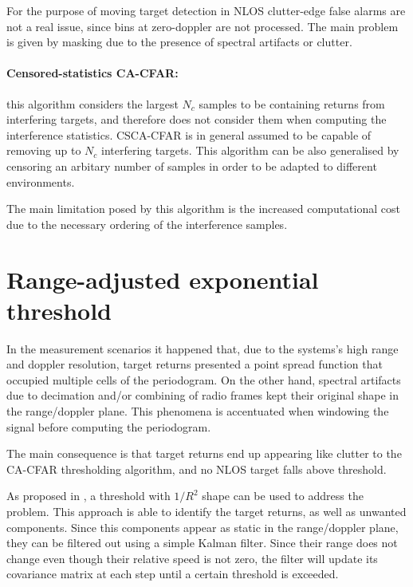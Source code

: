 For the purpose of moving target detection in NLOS clutter-edge false alarms are not a real issue, since bins at zero-doppler are not processed.
 The main problem is given by masking due to the presence of spectral artifacts or clutter.
 
 
\paragraph{Censored-statistics CA-CFAR:}
this algorithm considers the largest $N_c$ samples to be containing returns from interfering targets, and therefore does not consider them when computing the interference statistics. CSCA-CFAR is in general assumed to be capable of removing up to $N_c$ interfering targets.
This algorithm can be also generalised by censoring an arbitary number of samples in order to be adapted to different environments. 

The main limitation posed by this algorithm is the increased computational cost due to the necessary ordering of the interference samples.


\section{Range-adjusted exponential threshold}

In the measurement scenarios it happened that, due to the systems's high range and doppler resolution, target returns presented a point spread function that occupied multiple cells of the periodogram. On the other hand, spectral artifacts due to decimation and/or combining of radio frames kept their original shape in the range/doppler plane. This phenomena is accentuated when windowing the signal before computing the periodogram.

The main consequence is that target returns end up appearing like clutter to the CA-CFAR thresholding algorithm, and no NLOS target falls above threshold.

As proposed in \cite{Wagner_Feger_Stelzer_2017}, a threshold with $1/R^2$ shape can be used to address the problem. This approach is able to identify the target returns, as well as unwanted components. Since this components appear as static in the range/doppler plane, they can be filtered out using a simple Kalman filter. Since their range does not change even though their relative speed is not zero, the filter will update its covariance matrix at each step until a certain threshold is exceeded.





